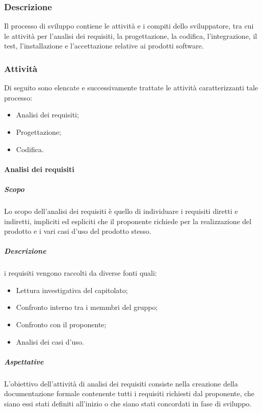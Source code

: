     \subsubsection{Descrizione} \label{subsubsection:Descrizione}
    Il processo di sviluppo contiene le attività e i compiti dello sviluppatore, tra cui le attività per l’analisi dei requisiti, la progettazione, 
    la codifica, l’integrazione, il test, l’installazione e l’accettazione relative ai prodotti software.

    \subsubsection{Attività} \label{subsubsection:Attività}
    Di seguito sono elencate e successivamente trattate le attività caratterizzanti tale processo:
    \begin{itemize}
        \item Analisi dei requisiti;
        \item Progettazione;
        \item Codifica.
    \end{itemize}
    
    \paragraph{Analisi dei requisiti} \label{paragraph:Analisi dei requisiti}
        \subparagraph{Scopo}
        Lo scopo dell’analisi dei requisiti è quello di individuare i requisiti diretti e indiretti, impliciti ed espliciti che il proponente richiede 
        per la realizzazione del prodotto e i vari casi d'uso del prodotto stesso.
    
        \subparagraph{Descrizione} \label{subparagraph:Descrizione}
        i requisiti vengono raccolti da diverse fonti quali:
       \begin{itemize}
           \item Lettura investigativa del capitolato;
           \item Confronto interno tra i memmbri del gruppo;
           \item Confronto con il proponente;
           \item Analisi dei casi d'uso.
       \end{itemize}

        \subparagraph{Aspettative} \label{subparagraph:Analisi dei requisiti}
        L’obiettivo dell’attività di analisi dei requisiti consiste nella creazione della documentazione formale contenente tutti i requisiti 
        richiesti dal proponente, che siano essi stati definiti all'inizio o che siano stati concordati in fase di sviluppo.


